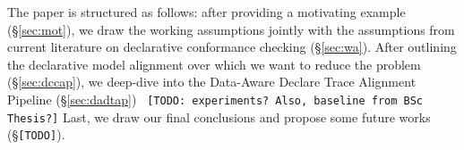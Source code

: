 The paper is structured as follows: after providing a motivating example (\S\ref{sec:mot}), we draw the working assumptions jointly with the assumptions from current literature on declarative conformance checking (\S\ref{sec:wa}). After outlining the declarative model alignment over which we want to reduce the problem (\S\ref{sec:dccap}), we deep-dive into the Data-Aware Declare Trace Alignment Pipeline (\S\ref{sec:dadtap}) \texttt{\color{red} [TODO: experiments? Also, baseline from BSc Thesis?]} Last, we draw our final conclusions and propose some future works (\S\texttt{\color{red}[TODO]}). 